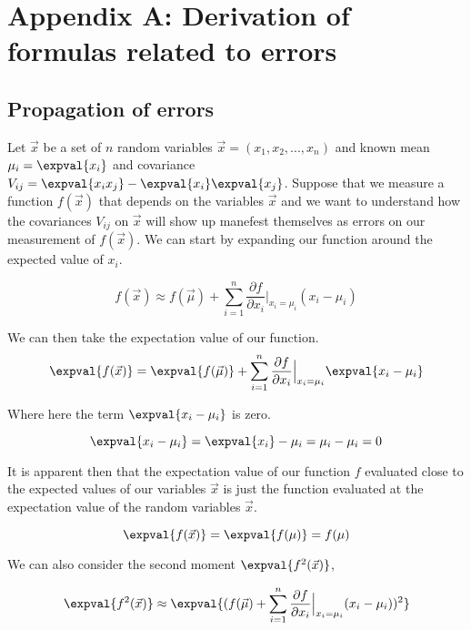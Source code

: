 \section*{Appendix A: Derivation of formulas related to errors}

\subsection*{Propagation of errors}

Let $\vec{x}$ be a set of $n$ random variables $\vec{x} = (x_1, x_2, ..., x_n)$ and known mean $\mu_i = \expval{x_i}$ and covariance $V_{ij} = \expval{x_i x_j}-\expval{x_i}\expval{x_j}$.  Suppose that we measure a function $f(\vec{x})$ that depends on the variables $\vec{x}$ and we want to understand how the covariances $V_{ij}$ on $\vec{x}$ will show up manefest themselves as errors on our measurement of $f(\vec{x})$.  We can start by expanding our function around the expected value of $x_i$.

\begin{equation}
        f(\vec{x}) \approx f(\vec{\mu}) + \sum_{i=1}^{n} \frac{\partial f}{\partial x_i} \Bigr|_{x_i = \mu_i} (x_i - \mu_i)
\end{equation}

We can then take the expectation value of our function.
\begin{equation}
        \expval{f(\vec{x})} = \expval{f(\vec{\mu})} + \sum_{i=1}^{n} \frac{\partial f}{\partial x_i} \Bigr|_{x_i = \mu_i} \expval{x_i - \mu_i}
\end{equation}

Where here the term $ \expval{x_i - \mu_i}$ is zero.

\begin{equation}
        \expval{x_i - \mu_i} = \expval{x_i} - \mu_i = \mu_i - \mu_i = 0
\end{equation}

It is apparent then that the expectation value of our function $f$ evaluated close to the expected values of our variables $\vec{x}$ is just the function evaluated at the expectation value of the random variables $\vec{x}$.

\begin{equation}
        \expval{f(\vec{x})} = \expval{f(\mu)} = f(\mu)
\end{equation}

We can also consider the second moment $\expval{f^2(\vec{x})}$,  

\begin{equation}
        \expval{f^2(\vec{x})} \approx \expval{ (f(\vec{\mu}) + \sum_{i=1}^{n} \frac{\partial f}{\partial x_i} \Bigr|_{x_i = \mu_i} (x_i - \mu_i))^2 }
\end{equation}

